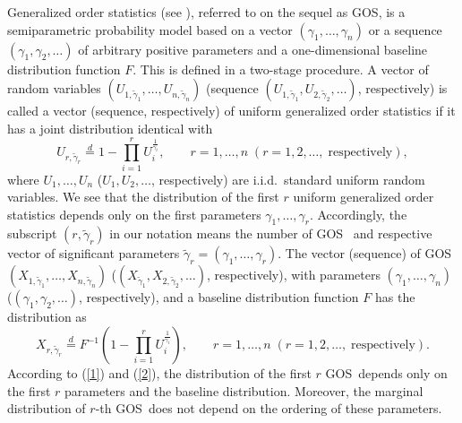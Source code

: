 \documentclass [11pt]{article}
\newcommand{\gos}{GOS}
\begin{document}
Generalized order statistics (see \cite{Kamps1995}), %
referred to on the sequel as \gos, is a semiparametric probability model based on a vector $(\gamma_1, \ldots, \gamma_n)$ or a sequence $(\gamma_1,\gamma_2, \ldots)$ of arbitrary positive parameters and a one-dimensional baseline distribution function $F$.
This is defined in a two-stage procedure. A vector of random variables $(U_{1,\tilde{\gamma}_1}, \ldots,U_{n,\tilde{\gamma}_n})$  (sequence $(U_{1,\tilde{\gamma}_1},U_{2,\tilde{\gamma}_2},\ldots)$, respectively) is called a vector (sequence, respectively) of uniform generalized order statistics if
it has a joint distribution identical with
\begin{equation}
U_{r,\tilde{\gamma}_r} \stackrel{d}{=}1- \prod_{i=1}^r U_i^{\frac{1}{\gamma_i}}, \qquad r=1,\ldots,n \;
(r=1,2,\ldots,\;\mathrm{respectively}),
\label{1}
\end{equation}
where $U_1, \ldots,U_n$ ($U_1,U_2,\ldots$, respectively) are i.i.d.\
standard uniform random variables. We see that
the distribution of the first $r$ uniform generalized order statistics depends only on the first parameters $\gamma_1,\ldots,
\gamma_r$.
Accordingly, the subscript $(r, \tilde{\gamma}_r)$ in our notation means the number of \gos\ %
and respective vector of significant parameters $\tilde{\gamma}_r=
(\gamma_1, \ldots, \gamma_r)$.
The vector (sequence) of \gos\ %
$(X_{1,\tilde{\gamma}_1}, \ldots,
X_{n,\tilde{\gamma}_n})$  ($(X_{\tilde{\gamma}_1}, X_{2,\tilde{\gamma}_2},\ldots)$, respectively), with
parameters $(\gamma_1, \ldots, \gamma_n)$
($(\gamma_1,\gamma_2, \ldots)$, respectively), and a baseline
distribution function $F$ has the distribution as
\begin{equation}
X_{r,\tilde{\gamma}_r} \stackrel{d}{=}F^{-1}
\left( 1- \prod_{i=1}^r U_i^{\frac{1}{\gamma_i}}\right),
\qquad r=1,\ldots,n \;
(r=1,2,\ldots,\;\mathrm{respectively}).
\label{2}
\end{equation}
According to (\ref{1}) and (\ref{2}), the distribution of the first $r$ \gos\ depends only on the first $r$ parameters and the baseline distribution. Moreover, the marginal distribution of $r$-th \gos\ does not depend on the ordering of these parameters.
\end{document}
